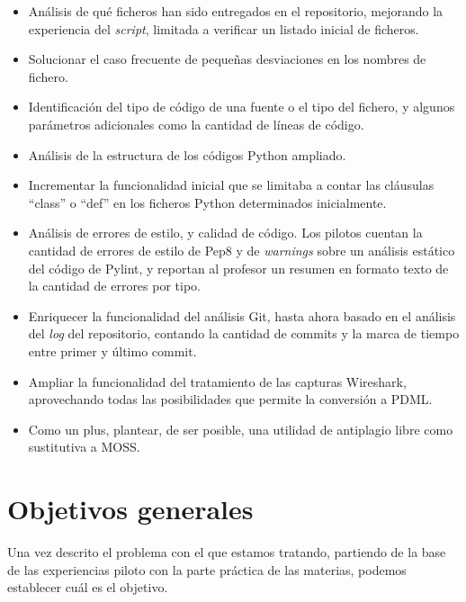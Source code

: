 \begin{itemize}
\item Análisis de qué ficheros han sido entregados en el repositorio, mejorando la experiencia del \textit{script}, limitada a verificar un listado inicial de ficheros.

\item Solucionar el caso frecuente de pequeñas desviaciones en los nombres de fichero.

\item Identificación del tipo de código de una fuente o el tipo del fichero, y algunos parámetros adicionales como la cantidad de líneas de código.

\item Análisis de la estructura de los códigos Python ampliado.

\item Incrementar la funcionalidad inicial que se limitaba a contar las cláusulas ``class'' o ``def'' en los ficheros Python determinados inicialmente.

\item Análisis de errores de estilo, y calidad de código. Los pilotos cuentan la cantidad de errores de estilo de Pep8 y de \textit{warnings} sobre un análisis estático del código de Pylint, y reportan al profesor un resumen en formato texto de la cantidad de errores por tipo.

\item Enriquecer la funcionalidad del análisis Git, hasta ahora basado en el análisis del \textit{log} del repositorio, contando la cantidad de commits y la marca de tiempo entre primer y último commit.

\item Ampliar la funcionalidad del tratamiento de las capturas Wireshark, aprovechando todas las posibilidades que permite la conversión a PDML.

\item Como un plus, plantear, de ser posible, una utilidad de antiplagio libre como sustitutiva a MOSS.
\end{itemize}


\section{Objetivos generales}
\label{sec:obj_gen}


Una vez descrito el problema con el que estamos tratando, partiendo de la base de las experiencias piloto con la parte práctica de las materias, podemos establecer cuál es el objetivo.


